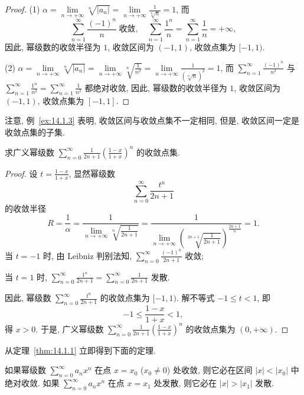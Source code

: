 \begin{proof}
(1) $\alpha=\lim\limits_{n\to+\infty}\sqrt[n]{|a_{n}|}=\lim\limits_{n\to+\infty}\frac{1}{\sqrt[n]{n}}=1$, 而
\[
  \sum_{n=1}^{\infty}\frac{(-1)^{n}}{n}\ \text{收敛},\quad\sum_{n=1}^{\infty}\frac{1^{n}}{n}=\sum_{n=1}^{\infty}\frac{1}{n}=+\infty,
\]
因此, 幂级数的收敛半径为 $1$, 收敛区间为 $(-1,1)$, 收敛点集为 $[-1,1)$.

(2) $\alpha=\lim\limits_{n\to+\infty}\sqrt[n]{|a_{n}|}=\lim\limits_{n\to+\infty}\sqrt[n]{\frac{1}{n^{2}}}=\lim\limits_{n\to+\infty}\frac{1}{(\sqrt[n]{n})^{2}}=1$, 而 $\sum_{n=1}^{\infty}\frac{(-1)^{n}}{n^{2}}$ 与 $\sum_{n=1}^{\infty}\frac{1^{n}}{n^{2}}=\sum_{n=1}^{\infty}\frac{1}{n^{2}}$ 都绝对收敛, 因此, 幂级数的收敛半径为 $1$, 收敛区间为 $(-1,1)$, 收敛点集为 $[-1,1]$.
\end{proof}

注意, 例~\ref{ex:14.1.3} 表明, 收敛区间与收敛点集不一定相同, 但是, 收敛区间一定是收敛点集的子集.

\begin{example}\label{ex:14.1.4}
求广义幂级数 $\sum_{n=0}^{\infty}\frac{1}{2n+1}\left(\frac{1-x}{1+x}\right)^{n}$ 的收敛点集.
\end{example}

\begin{proof}
设 $t=\frac{1-x}{1+x}$, 显然幂级数
\[
  \sum_{n=0}^{\infty}\frac{t^{n}}{2n+1}
\]
的收敛半径
\[
  R=\frac{1}{\alpha}=\frac{1}{\lim\limits_{n\to+\infty}\sqrt[n]{\frac{1}{2n+1}}}=\frac{1}{\lim\limits_{n\to+\infty}\left(\sqrt[2n+1]{\frac{1}{2n+1}}\right)^{\frac{2n+1}{n}}}=1.
\]
当 $t=-1$ 时, 由 Leibniz 判别法知, $\sum_{n=0}^{\infty}\frac{(-1)^{n}}{2n+1}$ 收敛;

当 $t=1$ 时, $\sum_{n=0}^{\infty}\frac{1^{n}}{2n+1}=\sum_{n=0}^{\infty}\frac{1}{2n+1}$ 发散.

因此, 幂级数 $\sum_{n=0}^{\infty}\frac{t^{n}}{2n+1}$ 的收敛点集为 $[-1,1)$. 解不等式 $-1\leqslant t<1$, 即
\[
  -1\leqslant\frac{1-x}{1+x}<1,
\]
得 $x>0$. 于是, 广义幂级数 $\sum_{n=0}^{\infty}\frac{1}{2n+1}\left(\frac{1-x}{1+x}\right)^{n}$ 的收敛点集为 $(0,+\infty)$.
\end{proof}

从定理~\ref{thm:14.1.1} 立即得到下面的定理.

\begin{theorem}[Abel]\label{thm:14.1.2}
如果幂级数 $\sum_{n=0}^{\infty}a_{n}x^{n}$ 在点 $x=x_{0}$ ($x_{0}\neq0$) 处收敛, 则它必在区间 $|x|<|x_{0}|$ 中绝对收敛. 如果 $\sum_{n=0}^{\infty}a_{n}x^{n}$ 在点 $x=x_{1}$ 处发散, 则它必在 $|x|>|x_{1}|$ 发散.
\end{theorem}

